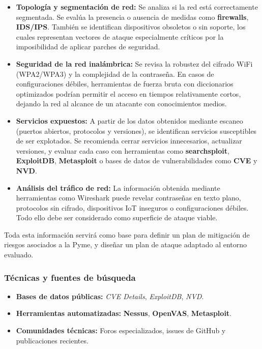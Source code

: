 \documentclass[a4paper, 11pt]{article}
\begin{document}
\begin{itemize}
    \item \textbf{Topología y segmentación de red:} Se analiza si la red está correctamente segmentada. Se evalúa la presencia o ausencia de medidas como \textbf{firewalls}, \textbf{IDS/IPS}. También se identifican dispositivos obsoletos o sin soporte, los cuales representan vectores de ataque especialmente críticos por la imposibilidad de aplicar parches de seguridad.

    \item \textbf{Seguridad de la red inalámbrica:} Se revisa la robustez del cifrado WiFi (WPA2/WPA3) y la complejidad de la contraseña. En casos de configuraciones débiles, herramientas de fuerza bruta con diccionarios optimizados podrían permitir el acceso en tiempos relativamente cortos, dejando la red al alcance de un atacante con conocimientos medios.

    \item \textbf{Servicios expuestos:} A partir de los datos obtenidos mediante escaneo (puertos abiertos, protocolos y versiones), se identifican servicios susceptibles de ser explotados. Se recomienda cerrar servicios innecesarios, actualizar versiones, y evaluar cada caso con herramientas como \textbf{searchsploit}, \textbf{ExploitDB}, \textbf{Metasploit} o bases de datos de vulnerabilidades como \textbf{CVE} y \textbf{NVD}.
    
    \item \textbf{Análisis del tráfico de red:} La información obtenida mediante herramientas como Wireshark puede revelar contraseñas en texto plano, protocolos sin cifrado, dispositivos IoT inseguros o configuraciones débiles. Todo ello debe ser considerado como superficie de ataque viable.
\end{itemize}

\vspace{0.3cm}
Toda esta información servirá como base para definir un plan de mitigación de riesgos asociados a la Pyme, y diseñar un plan de ataque adaptado al entorno evaluado.


\subsubsection*{Técnicas y fuentes de búsqueda}

\begin{itemize}
    \item \textbf{Bases de datos públicas:} \textit{CVE Details}, \textit{ExploitDB}, \textit{NVD}.
    \item \textbf{Herramientas automatizadas:} \textbf{Nessus}, \textbf{OpenVAS}, \textbf{Metasploit}.
    \item \textbf{Comunidades técnicas:} Foros especializados, issues de GitHub y publicaciones recientes.
\end{itemize}
\end{document}
